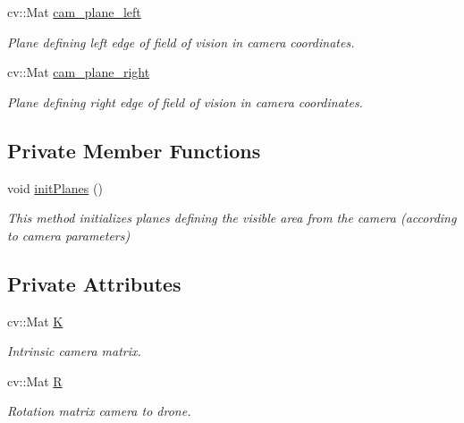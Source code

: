 \begin{DoxyCompactItemize}
\mbox{\label{structCamera_aebad25ab660ec7783bc5ac04438f7ae4}} 
cv\+::\+Mat \hyperlink{structCamera_aebad25ab660ec7783bc5ac04438f7ae4}{cam\+\_\+plane\+\_\+left}
\begin{DoxyCompactList}\small\item\em Plane defining left edge of field of vision in camera coordinates. \end{DoxyCompactList}\item 
\mbox{\label{structCamera_ac185e1126f097594dcbe31df39307f2d}} 
cv\+::\+Mat \hyperlink{structCamera_ac185e1126f097594dcbe31df39307f2d}{cam\+\_\+plane\+\_\+right}
\begin{DoxyCompactList}\small\item\em Plane defining right edge of field of vision in camera coordinates. \end{DoxyCompactList}\end{DoxyCompactItemize}
\subsection*{Private Member Functions}
\begin{DoxyCompactItemize}
\item 
\mbox{\label{structCamera_a0bdcc221c0b0f2b7d94d777c845b1830}} 
void \hyperlink{structCamera_a0bdcc221c0b0f2b7d94d777c845b1830}{init\+Planes} ()
\begin{DoxyCompactList}\small\item\em This method initializes planes defining the visible area from the camera (according to camera parameters) \end{DoxyCompactList}\end{DoxyCompactItemize}
\subsection*{Private Attributes}
\begin{DoxyCompactItemize}
\item 
\mbox{\label{structCamera_a7cef7ea1429494c0497ce6e7e0e6124c}} 
cv\+::\+Mat \hyperlink{structCamera_a7cef7ea1429494c0497ce6e7e0e6124c}{K}
\begin{DoxyCompactList}\small\item\em Intrinsic camera matrix. \end{DoxyCompactList}\item 
\mbox{\label{structCamera_a10c6e1e6a928c2b773d2e24ea4c804d6}} 
cv\+::\+Mat \hyperlink{structCamera_a10c6e1e6a928c2b773d2e24ea4c804d6}{R}
\begin{DoxyCompactList}\small\item\em Rotation matrix camera to drone. \end{DoxyCompactList}\end{DoxyCompactItemize}


